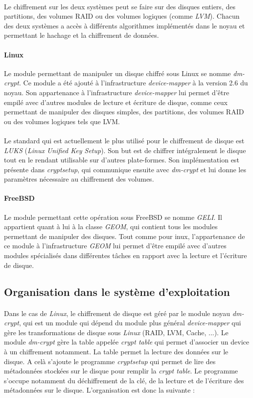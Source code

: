 \paragraph{}
Le chiffrement sur les deux systèmes peut se faire sur des disques entiers, des
partitions, des volumes RAID ou des volumes logiques (comme \textit{LVM}).
Chacun des deux systèmes a accès à différents algorithmes implémentés dans le
noyau et permettant le hachage et la chiffrement de données.
\paragraph{Linux}
Le module permettant de manipuler un disque chiffré sous Linux se nomme
\textit{dm-crypt}. Ce module a été ajouté à l'infrastructure
\textit{device-mapper} à la version 2.6 du noyau. Son appartenance à
l'infrastructure \textit{device-mapper} lui permet d'être empilé avec d'autres
modules de lecture et écriture de disque, comme ceux permettant de manipuler des
disques simples, des partitions, des volumes RAID ou des volumes logiques tels
que LVM.\\
\\
Le standard qui est actuellement le plus utilisé pour le chiffrement de disque
est \textit{LUKS} (\textit{Linux Unified Key Setup}). Son but est de chiffrer
intégralement le disque tout en le rendant utilisable sur d'autres plate-formes.
Son implémentation est présente dans \textit{cryptsetup}, qui communique ensuite
avec \textit{dm-crypt} et lui donne les paramètres nécessaire au chiffrement des
volumes.
\paragraph{FreeBSD}
Le module permettant cette opération sous FreeBSD se nomme \textit{GELI}. Il
appartient quant à lui à la classe \textit{GEOM}, qui contient tous les modules
permettant de manipuler des disques. Tout comme pour inux, l'appartenance de ce
module à l'infrastructure \textit{GEOM} lui permet d'être empilé avec d'autres
modules spécialisés dans différentes tâches en rapport avec la lecture et
l'écriture de disque.

\subsection{Organisation dans le système d'exploitation}
\paragraph{}
Dans le cas de {\em Linux}, le chiffrement de disque est géré par le module 
noyau {\em dm-crypt}, qui est un module qui dépend du module plus général
{\em device-mapper} qui gère les transformations de disque sous {\em Linux} 
(RAID, LVM, Cache, ...).
Le module {\em dm-crypt} gère la table appelée {\em crypt table}
qui permet d'associer un device à un chiffrement notamment. La table permet
la lecture des données sur le disque. A celà s'ajoute le programme 
{\em cryptsetup} qui permet de lire des métadonnées stockées sur le disque 
pour remplir la {\em crypt table}.
Le programme s'occupe notamment du déchiffrement de la clé, de 
la lecture et de l'écriture des métadonnées sur le disque. L'organisation est 
donc la suivante :

